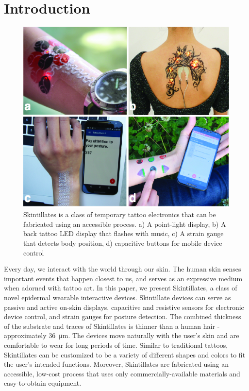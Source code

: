 \documentclass{sigchi}
\begin{document}
\section{Introduction}
\begin{figure}[!h]
\centering
\includegraphics[width=1\columnwidth]{figures/Figure1}
\caption{Skintillates is a class of temporary tattoo electronics that can be fabricated using an accessible process. a) A point-light display, b) A back tattoo LED display that flashes with music, c) A strain gauge that detects body position, d) capacitive buttons for mobile device control}
\vspace{-8pt}
\label{fig:overall}
\end{figure}
Every day, we interact with the world through our skin. The human skin senses important events that happen closest to us, and serves as an expressive medium when adorned with tattoo art. In this paper, we present Skintillates, a class of novel epidermal wearable interactive devices. Skintillate devices can serve as passive and active on-skin displays, capacitive and resistive sensors for electronic device control, and strain gauges for posture detection. The combined thickness of the substrate and traces of Skintillates is thinner than a human hair - approximately 36\SI{}{\micro\metre}. The devices move naturally with the user’s skin and are comfortable to wear for long periods of time. Similar to traditional tattoos, Skintillates can be customized to be a variety of different shapes and colors to fit the user's intended functions. Moreover, Skintillates are fabricated using an accessible, low-cost process that uses only commercially-available     materials     and      easy-to-obtain equipment. 
\end{document}
